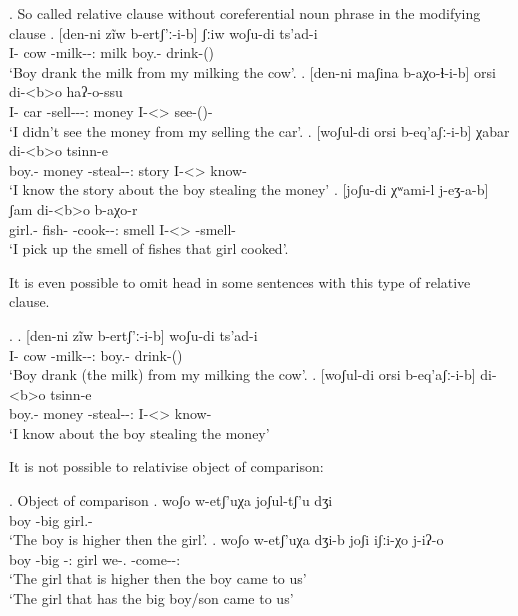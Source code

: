 \ex. So called relative clause without coreferential noun phrase in the modifying clause
	\ag. [den-ni zĩw b-ertʃ'ː-i-b] ʃːiw woʃu-di ts'ad-i\\
			{I-\Erg} cow {\An-milk-\Pst-\Ptcp:\Pst} milk {boy.\Obl-\Erg} {drink-\Pst(\Aor)}\\
			\glt `Boy drank the milk from my milking the cow'.
	\bg. [den-ni maʃina b-aχo-ɬ-i-b] orsi di-<b>o haʔ-o-ssu\\
			 {I-\Erg}  car {\Nanf-sell-\Caus-\Pst-\Ptcp:\Pst} money {I-<\Nanf>\Aff} {see-\Pst(\Aor)-\Neg}\\
			 \glt `I didn't see the money from my selling the car'.
	\bg. [woʃul-di orsi b-eq'aʃː-i-b] χabar di-<b>o tsinn-e\\
			{boy.\Obl-\Erg} money {\Nanf-steal-\Pst-\Ptcp:\Pst} story {I-<\Nanf>\Aff} {know-\Hab}\\
			\glt `I know the story about the boy stealing the money'
	\bg. [joʃu-di χʷami-l j-eʒ-a-b] ʃam di-<b>o b-aχo-r\\
			{girl.\Obl-\Erg} {fish-\Pl} {\F-cook-\Pst-\Ptcp:\Pst} smell {I-<\Nanf>\Aff} {\Nanf-smell-\Prog}\\
			\glt `I pick up the smell of fishes that girl cooked'.

It is even possible to omit head in some sentences with this type of relative clause.

\ex. 
	\ag. [den-ni zĩw b-ertʃ'ː-i-b] woʃu-di ts'ad-i\\
			{I-\Erg} cow {\An-milk-\Pst-\Ptcp:\Pst} {boy.\Obl-\Erg} {drink-\Pst(\Aor)}\\
			\glt `Boy drank (the milk) from my milking the cow'.
	\bg. [woʃul-di orsi b-eq'aʃː-i-b] di-<b>o tsinn-e\\
			{boy.\Obl-\Erg} money {\Nanf-steal-\Pst-\Ptcp:\Pst} {I-<\Nanf>\Aff} {know-\Hab}\\
			\glt `I know about the boy stealing the money'			 
			 
It is not possible to relativise object of comparison:

\ex. Object of comparison
	\ag. woʃo w-etʃ'uχa joʃul-tʃ'u dʒi\\
			boy {\M-big} {girl.\Obl-\Ads} \Cop\\
			\glt `The boy is higher then the girl'.
	\bg. woʃo w-etʃ'uχa dʒi-b joʃi iʃːi-χo j-iʔ-o\\
			 boy {\M-big} {\Cop-\Ptcp:\Pst} girl  {we-\Add.\Lat} {\F-come-\Pst-\Ptcp:\Pst}\\
			 \glt *`The girl that is higher then the boy came to us'\\
					 `The girl that has the big boy/son came to us'

